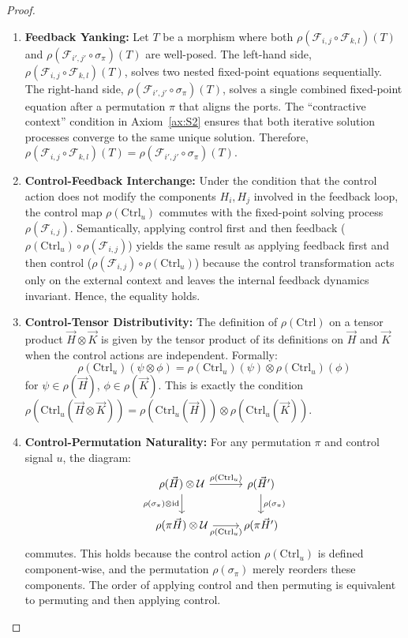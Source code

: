 \documentclass[11pt]{article}
\begin{document}
\begin{proof}
\begin{enumerate}[label=(SC\arabic*), leftmargin=*]
    \item \textbf{Feedback Yanking:} Let $T$ be a morphism where both $\rho(\mathcal{F}_{i,j} \circ \mathcal{F}_{k,l})(T)$ and $\rho(\mathcal{F}_{i',j'} \circ \sigma_{\pi})(T)$ are well-posed. The left-hand side, $\rho(\mathcal{F}_{i,j} \circ \mathcal{F}_{k,l})(T)$, solves two nested fixed-point equations sequentially. The right-hand side, $\rho(\mathcal{F}_{i',j'} \circ \sigma_{\pi})(T)$, solves a single combined fixed-point equation after a permutation $\pi$ that aligns the ports. The ``contractive context'' condition in Axiom~\ref{ax:S2} ensures that both iterative solution processes converge to the same unique solution. Therefore, $\rho(\mathcal{F}_{i,j} \circ \mathcal{F}_{k,l})(T) = \rho(\mathcal{F}_{i',j'} \circ \sigma_{\pi})(T)$.

    \item \textbf{Control-Feedback Interchange:} Under the condition that the control action does not modify the components $H_i, H_j$ involved in the feedback loop, the control map $\rho(\mathrm{Ctrl}_u)$ commutes with the fixed-point solving process $\rho(\mathcal{F}_{i,j})$. Semantically, applying control first and then feedback ($\rho(\mathrm{Ctrl}_u) \circ \rho(\mathcal{F}_{i,j})$) yields the same result as applying feedback first and then control ($\rho(\mathcal{F}_{i,j}) \circ \rho(\mathrm{Ctrl}_u)$) because the control transformation acts only on the external context and leaves the internal feedback dynamics invariant. Hence, the equality holds.

    \item \textbf{Control-Tensor Distributivity:} The definition of $\rho(\mathrm{Ctrl})$ on a tensor product $\vec{H} \otimes \vec{K}$ is given by the tensor product of its definitions on $\vec{H}$ and $\vec{K}$ when the control actions are independent. Formally:
    \[
    \rho(\mathrm{Ctrl}_u)(\psi \otimes \phi) = \rho(\mathrm{Ctrl}_u)(\psi) \otimes \rho(\mathrm{Ctrl}_u)(\phi)
    \]
    for $\psi \in \rho(\vec{H})$, $\phi \in \rho(\vec{K})$. This is exactly the condition $\rho(\mathrm{Ctrl}_u(\vec{H} \otimes \vec{K})) = \rho(\mathrm{Ctrl}_u(\vec{H})) \otimes \rho(\mathrm{Ctrl}_u(\vec{K}))$.

    \item \textbf{Control-Permutation Naturality:} For any permutation $\pi$ and control signal $u$, the diagram:
    \[
    \begin{tikzcd}
    \rho(\vec{H}) \otimes \mathcal{U} \arrow[r, "\rho(\mathrm{Ctrl}_u)"] \arrow[d, "\rho(\sigma_{\pi}) \otimes \mathrm{id}"'] & \rho(\vec{H}') \arrow[d, "\rho(\sigma_{\pi})"] \\
    \rho(\pi\vec{H}) \otimes \mathcal{U} \arrow[r, "\rho(\mathrm{Ctrl}_u)"'] & \rho(\pi\vec{H}')
    \end{tikzcd}
    \]
    commutes. This holds because the control action $\rho(\mathrm{Ctrl}_u)$ is defined component-wise, and the permutation $\rho(\sigma_{\pi})$ merely reorders these components. The order of applying control and then permuting is equivalent to permuting and then applying control.


\end{enumerate}
\end{proof}
\end{document}
